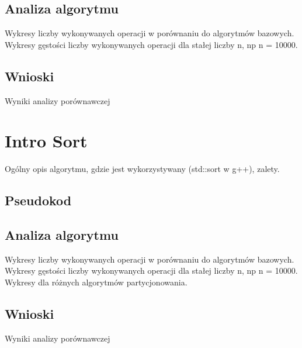 \subsection{Analiza algorytmu}
Wykresy liczby wykonywanych operacji w porównaniu do algorytmów bazowych.
Wykresy gęstości liczby wykonywanych operacji dla stałej liczby n, np n = 10000.

\subsection{Wnioski}
Wyniki analizy porównawczej


\section{Intro Sort}
Ogólny opis algorytmu, gdzie jest wykorzystywany (std::sort w g++), zalety.
\subsection{Pseudokod}

\subsection{Analiza algorytmu}
Wykresy liczby wykonywanych operacji w porównaniu do algorytmów bazowych.
Wykresy gęstości liczby wykonywanych operacji dla stałej liczby n, np n = 10000.
Wykresy dla różnych algorytmów partycjonowania.

\subsection{Wnioski}
Wyniki analizy porównawczej



